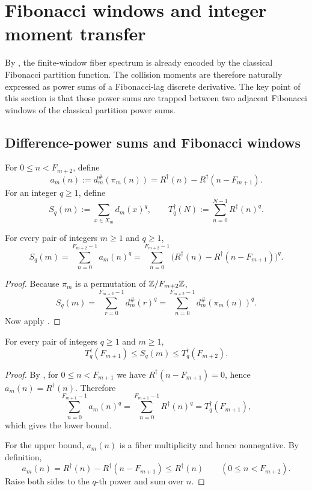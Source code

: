 \section{Fibonacci windows and integer moment transfer}
\label{sec:second-collision}

By , the finite-window fiber spectrum is already
encoded by the classical Fibonacci partition function.  The collision moments
are therefore naturally expressed as power sums of a Fibonacci-lag discrete
derivative.  The key point of this section is that those power sums are
trapped between two adjacent Fibonacci windows of the classical partition
power sums.

\subsection{Difference-power sums and Fibonacci windows}

\begin{definition}
\label{def:difference-spectrum}
For \(0\le n<F_{m+2}\), define
\[
  a_m(n):=d_m^\#(\pi_m(n))
  =
  R^\dagger(n)-R^\dagger(n-F_{m+1}).
\]
For an integer \(q\ge 1\), define
\[
  S_q(m):=\sum_{x\in X_m} d_m(x)^q,
  \qquad
  T_q^\dagger(N):=\sum_{n=0}^{N-1} R^\dagger(n)^q.
\]
\end{definition}

\begin{theorem}
\label{thm:difference-power-sums}
For every pair of integers \(m\ge1\) and \(q\ge 1\),
\[
  S_q(m)
  =
  \sum_{n=0}^{F_{m+2}-1} a_m(n)^q
  =
  \sum_{n=0}^{F_{m+2}-1}
  \bigl(R^\dagger(n)-R^\dagger(n-F_{m+1})\bigr)^q.
\]
\end{theorem}

\begin{proof}
Because \(\pi_m\) is a permutation of \(\mathbb{Z}/F_{m+2}\mathbb{Z}\),
\[
  S_q(m)
  =
  \sum_{r=0}^{F_{m+2}-1} d_m^\#(r)^q
  =
  \sum_{n=0}^{F_{m+2}-1} d_m^\#(\pi_m(n))^q.
\]
Now apply .
\end{proof}

\begin{theorem}
\label{thm:fibonacci-window-sandwich}
For every pair of integers \(q\ge 1\) and \(m\ge 1\),
\[
  T_q^\dagger(F_{m+1})\le S_q(m)\le T_q^\dagger(F_{m+2}).
\]
\end{theorem}

\begin{proof}
By , for \(0\le n<F_{m+1}\) we have
\(R^\dagger(n-F_{m+1})=0\), hence \(a_m(n)=R^\dagger(n)\).  Therefore
\[
  \sum_{n=0}^{F_{m+1}-1} a_m(n)^q
  =
  \sum_{n=0}^{F_{m+1}-1} R^\dagger(n)^q
  =
  T_q^\dagger(F_{m+1}),
\]
which gives the lower bound.

For the upper bound, \(a_m(n)\) is a fiber multiplicity and hence nonnegative.
By definition,
\[
  a_m(n)=R^\dagger(n)-R^\dagger(n-F_{m+1})\le R^\dagger(n)
  \qquad (0\le n<F_{m+2}).
\]
Raise both sides to the \(q\)-th power and sum over \(n\).
\end{proof}

